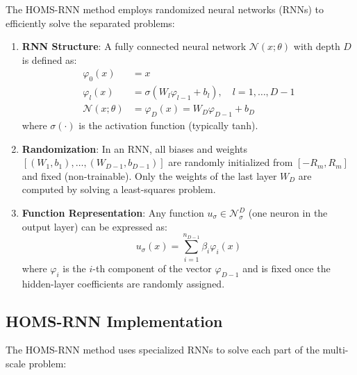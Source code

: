 \documentclass[11pt]{article}
\begin{document}
The HOMS-RNN method employs randomized neural networks (RNNs) to efficiently solve the separated problems:

\begin{enumerate}
    \item \textbf{RNN Structure}: A fully connected neural network $\mathcal{N}(x;\theta)$ with depth $D$ is defined as:
    \begin{equation}
    \begin{aligned}
    \varphi_0(x) &= x \\
    \varphi_l(x) &= \sigma(W_l\varphi_{l-1} + b_l), \quad l = 1,\ldots,D-1 \\
    \mathcal{N}(x;\theta) &= \varphi_D(x) = W_D\varphi_{D-1} + b_D
    \end{aligned}
    \end{equation}
    where $\sigma(\cdot)$ is the activation function (typically tanh).
    
    \item \textbf{Randomization}: In an RNN, all biases and weights $[(W_1,b_1),\ldots,(W_{D-1},b_{D-1})]$ are randomly initialized from $[-R_m,R_m]$ and fixed (non-trainable). Only the weights of the last layer $W_D$ are computed by solving a least-squares problem.
    
    \item \textbf{Function Representation}: Any function $u_\sigma \in \mathcal{N}^D_\sigma$ (one neuron in the output layer) can be expressed as:
    \begin{equation}
    u_\sigma(x) = \sum_{i=1}^{n_{D-1}} \beta_i \varphi_i(x)
    \end{equation}
    where $\varphi_i$ is the $i$-th component of the vector $\varphi_{D-1}$ and is fixed once the hidden-layer coefficients are randomly assigned.
\end{enumerate}

\subsection{HOMS-RNN Implementation}

The HOMS-RNN method uses specialized RNNs to solve each part of the multi-scale problem:
\end{document}
